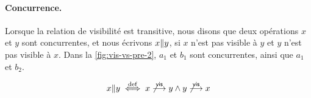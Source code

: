 


\paragraph{Concurrence.}
Lorsque la relation de visibilité est transitive, nous disons que deux opérations $x$ et $y$ sont concurrentes, et nous écrivons $x \| y$, si $x$ n'est pas visible à $y$ et $y$ n'est pas visible à $x$.
Dans la \autoref{fig:vis-vs-pre-2}, $a_1$ et $b_1$ sont concurrentes, ainsi que $a_1$ et $b_2$.

\begin{equation*}
    x \| y \overset{\mathrm{def}}{\iff} x \not\overset{\mathsf{vis}}{\longrightarrow} y \land y \not\overset{\mathsf{vis}}{\longrightarrow} x
\end{equation*}

